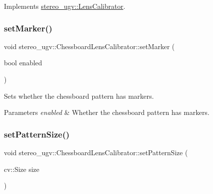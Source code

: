 Implements \hyperlink{classstereo__ugv_1_1LensCalibrator_ad25267d7b60a912f270701359eda1c54}{stereo\+\_\+ugv\+::\+Lens\+Calibrator}.

\mbox{\label{classstereo__ugv_1_1ChessboardLensCalibrator_af2814fa1b58cdb9b2a8c3a1c46113da8}} 
\subsubsection{\texorpdfstring{set\+Marker()}{setMarker()}}
{\footnotesize\ttfamily void stereo\+\_\+ugv\+::\+Chessboard\+Lens\+Calibrator\+::set\+Marker (\begin{DoxyParamCaption}\item[{bool}]{enabled }\end{DoxyParamCaption})}



Sets whether the chessboard pattern has markers. 


\begin{DoxyParams}{Parameters}
{\em enabled} & Whether the chessboard pattern has markers. \\
\hline
\end{DoxyParams}
\mbox{\label{classstereo__ugv_1_1ChessboardLensCalibrator_aeda7a0a6538957e6174277931abf5cd4}} 
\subsubsection{\texorpdfstring{set\+Pattern\+Size()}{setPatternSize()}}
{\footnotesize\ttfamily void stereo\+\_\+ugv\+::\+Chessboard\+Lens\+Calibrator\+::set\+Pattern\+Size (\begin{DoxyParamCaption}\item[{cv\+::\+Size}]{size }\end{DoxyParamCaption})}




